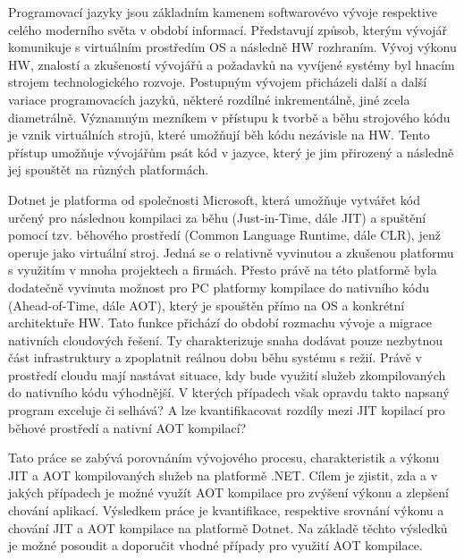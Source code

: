 Programovací jazyky jsou základním kamenem softwarovévo vývoje respektive celého moderního světa v období informací. Představují způsob, kterým vývojář komunikuje s virtuálním prostředím OS a následně HW rozhraním. Vývoj výkonu HW, znalostí a zkušeností vývojářů a požadavků na vyvíjené systémy byl hnacím strojem technologického rozvoje. Postupným vývojem přicházeli další a další variace programovacích jazyků, některé rozdílné inkrementálně, jiné zcela diametrálně. Významným mezníkem v přístupu k tvorbě a běhu strojového kódu je vznik virtuálních strojů, které umožňují běh kódu nezávisle na HW. Tento přístup umožňuje vývojářům psát kód v jazyce, který je jim přirozený a následně jej spouštět na různých platformách.

Dotnet je platforma od společnosti Microsoft, která umožňuje vytvářet kód určený pro následnou kompilaci za běhu (Just-in-Time, dále JIT) a spuštění pomocí tzv. běhového prostředí (Common Language Runtime, dále CLR), jenž operuje jako virtuální stroj. Jedná se o relativně vyvinutou a zkušenou platformu s využitím v mnoha projektech a firmách. Přesto právě na této platformě byla dodatečně vyvinuta možnost pro PC platformy kompilace do nativního kódu (Ahead-of-Time, dále AOT), který je spouštěn přímo na OS a konkrétní architektuře HW. Tato funkce přichází do období rozmachu vývoje a migrace nativních cloudových řešení. Ty charakterizuje snaha dodávat pouze nezbytnou část infrastruktury a zpoplatnit reálnou dobu běhu systému s režií. Právě v prostředí cloudu mají nastávat situace, kdy bude využití služeb zkompilovaných do nativního kódu výhodnější. V kterých případech však opravdu takto napsaný program exceluje či selhává? A lze kvantifikacovat rozdíly mezi JIT kopilací pro běhové prostředí a nativní AOT kompilací?

Tato práce se zabývá porovnáním vývojového procesu, charakteristik a výkonu JIT a AOT kompilovaných služeb na platformě .NET. Cílem je zjistit, zda a v jakých případech je možné využít AOT kompilace pro zvýšení výkonu a zlepšení chování aplikací. Výsledkem práce je kvantifikace, respektive srovnání výkonu a chování JIT a AOT kompilace na platformě Dotnet. Na základě těchto výsledků je možné posoudit a doporučit vhodné případy pro využití AOT kompilace.